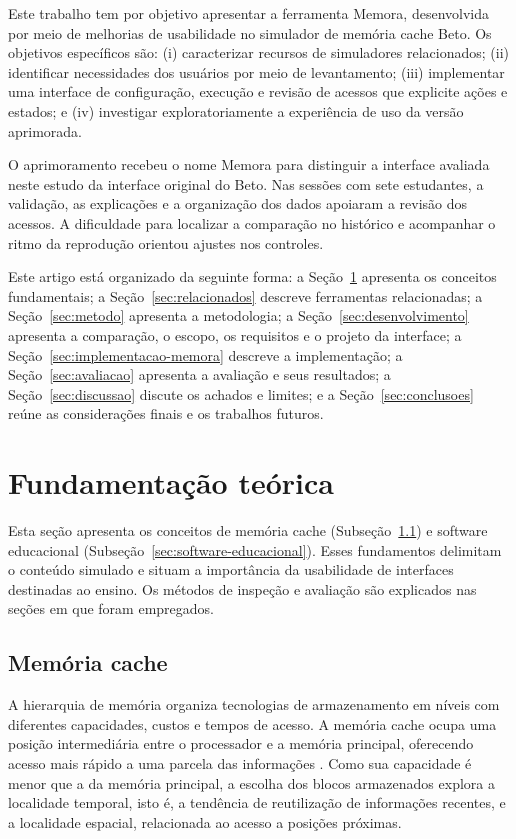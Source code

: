 \documentclass[article,12pt,oneside,a4paper,english,brazil]{abntex2}
\begin{document}
Este trabalho tem por objetivo apresentar a ferramenta Memora, desenvolvida por meio de melhorias de usabilidade no simulador de memória cache Beto. Os objetivos específicos são: (i) caracterizar recursos de simuladores relacionados; (ii) identificar necessidades dos usuários por meio de levantamento; (iii) implementar uma interface de configuração, execução e revisão de acessos que explicite ações e estados; e (iv) investigar exploratoriamente a experiência de uso da versão aprimorada.

O aprimoramento recebeu o nome Memora para distinguir a interface avaliada neste estudo da interface original do Beto. Nas sessões com sete estudantes, a validação, as explicações e a organização dos dados apoiaram a revisão dos acessos. A dificuldade para localizar a comparação no histórico e acompanhar o ritmo da reprodução orientou ajustes nos controles.

Este artigo está organizado da seguinte forma: a Seção~\ref{sec:visao-geral-cache} apresenta os conceitos fundamentais; a Seção~\ref{sec:relacionados} descreve ferramentas relacionadas; a Seção~\ref{sec:metodo} apresenta a metodologia; a Seção~\ref{sec:desenvolvimento} apresenta a comparação, o escopo, os requisitos e o projeto da interface; a Seção~\ref{sec:implementacao-memora} descreve a implementação; a Seção~\ref{sec:avaliacao} apresenta a avaliação e seus resultados; a Seção~\ref{sec:discussao} discute os achados e limites; e a Seção~\ref{sec:conclusoes} reúne as considerações finais e os trabalhos futuros.

\section{Fundamentação teórica}
\label{sec:visao-geral-cache}

Esta seção apresenta os conceitos de memória cache (Subseção~\ref{sec:conceitos-cache}) e software educacional (Subseção~\ref{sec:software-educacional}). Esses fundamentos delimitam o conteúdo simulado e situam a importância da usabilidade de interfaces destinadas ao ensino. Os métodos de inspeção e avaliação são explicados nas seções em que foram empregados.

\subsection{Memória cache}
\label{sec:conceitos-cache}

A hierarquia de memória organiza tecnologias de armazenamento em níveis com diferentes capacidades, custos e tempos de acesso. A memória cache ocupa uma posição intermediária entre o processador e a memória principal, oferecendo acesso mais rápido a uma parcela das informações \cite{patterson2014computer}. Como sua capacidade é menor que a da memória principal, a escolha dos blocos armazenados explora a localidade temporal, isto é, a tendência de reutilização de informações recentes, e a localidade espacial, relacionada ao acesso a posições próximas.
\end{document}
